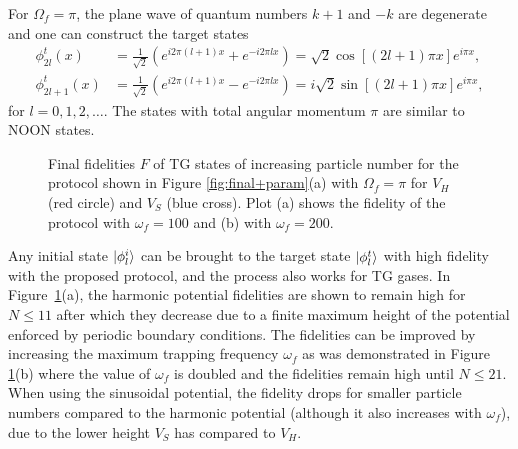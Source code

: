 For $\Omega_f=\pi$, the plane wave of quantum numbers $k+1$ and $-k$ are degenerate and one can construct the target states
\begin{align}
\phi^t_{2l}(x)&=\frac{1}{\sqrt 2} \left( e^{i 2 \pi (l+1) x} + e^{-i 2 \pi l x} \right) = \sqrt{2} \cos[(2l+1) \pi x] e^{i \pi x} , \\
\phi^t_{2l+1}(x)&=\frac{1}{\sqrt 2} \left( e^{i 2 \pi (l+1) x}-e^{-i 2 \pi l x} \right) = i \sqrt{2} \sin[(2l+1) \pi x]e^{i \pi x} ,
\end{align}
for $l=0,1,2,\ldots$.
The states with total angular momentum $\pi$ are similar to NOON states.

\begin{figure}
\centering
{}
\caption{ Final fidelities $F$ of TG states of increasing particle number for the protocol shown in Figure \ref{fig:final+param}(a) with $\Omega_f = \pi$ for $V_H$ (red circle) and $V_S$ (blue cross). Plot (a) shows the fidelity of the protocol with $\omega_f = 100$ and (b) with $\omega_f = 200$.}
\label{fig:TG-STA}
\end{figure}

Any initial state $\ket{\phi^i_l}$ can be brought to the target state $\ket{\phi^t_l}$ with high fidelity with the proposed protocol, and the process also works for TG gases.
In Figure~\ref{fig:TG-STA}(a), the harmonic potential fidelities are shown to remain high for $N \leq 11$ after which they decrease due to a finite maximum height of the potential enforced by periodic boundary conditions.
The fidelities can be improved by increasing the maximum trapping frequency $\omega_f$ as was demonstrated in Figure \ref{fig:TG-STA}(b) where the value of $\omega_f$ is doubled and the fidelities remain high until $N \leq 21$.
When using the sinusoidal potential, the fidelity drops for smaller particle numbers compared to the  harmonic potential (although it also increases with $\omega_f$), due to the lower height $V_S$ has compared to $V_H$.

